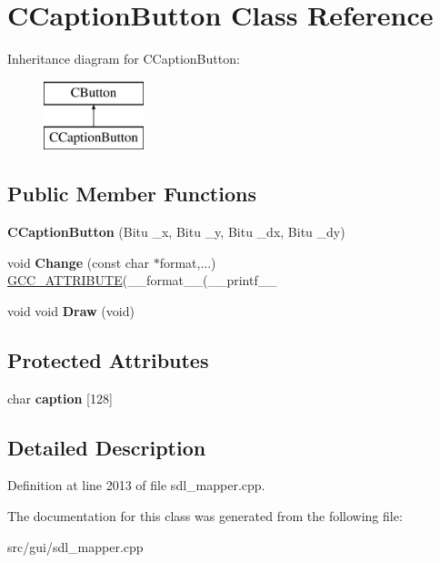 \hypertarget{classCCaptionButton}{\section{C\-Caption\-Button Class Reference}
\label{classCCaptionButton}
}
Inheritance diagram for C\-Caption\-Button\-:\begin{figure}[H]
\begin{center}
\leavevmode
\includegraphics[height=2.000000cm]{classCCaptionButton}
\end{center}
\end{figure}
\subsection*{Public Member Functions}
\begin{DoxyCompactItemize}
\item 
\hypertarget{classCCaptionButton_ab3693869d536d69e5a5c206f22865583}{{\bfseries C\-Caption\-Button} (Bitu \-\_\-x, Bitu \-\_\-y, Bitu \-\_\-dx, Bitu \-\_\-dy)}\label{classCCaptionButton_ab3693869d536d69e5a5c206f22865583}

\item 
\hypertarget{classCCaptionButton_a497661808a80201830f2241f75750e90}{void {\bfseries Change} (const char $\ast$format,...) \hyperlink{structGCC__ATTRIBUTE}{G\-C\-C\-\_\-\-A\-T\-T\-R\-I\-B\-U\-T\-E}(\-\_\-\-\_\-format\-\_\-\-\_\-(\-\_\-\-\_\-printf\-\_\-\-\_\-}\label{classCCaptionButton_a497661808a80201830f2241f75750e90}

\item 
\hypertarget{classCCaptionButton_a953f5b12ba13b61bc373fc3d25295079}{void void {\bfseries Draw} (void)}\label{classCCaptionButton_a953f5b12ba13b61bc373fc3d25295079}

\end{DoxyCompactItemize}
\subsection*{Protected Attributes}
\begin{DoxyCompactItemize}
\item 
\hypertarget{classCCaptionButton_a6e015cc9759137aa04d7c54bd936233b}{char {\bfseries caption} \mbox{[}128\mbox{]}}\label{classCCaptionButton_a6e015cc9759137aa04d7c54bd936233b}

\end{DoxyCompactItemize}


\subsection{Detailed Description}


Definition at line 2013 of file sdl\-\_\-mapper.\-cpp.



The documentation for this class was generated from the following file\-:\begin{DoxyCompactItemize}
\item 
src/gui/sdl\-\_\-mapper.\-cpp\end{DoxyCompactItemize}
